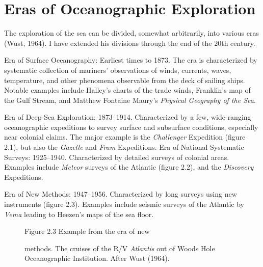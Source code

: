 \section{Eras of Oceanographic Exploration}
The exploration of the sea
can be divided, somewhat arbitrarily, into various eras (Wust,
1964). I have extended his divisions through the end of the 20th
century.
\begin{enumerate}
\vitem Era of Surface Oceanography: Earliest times to 1873. The era is
characterized by systematic collection of mariners' observations of
winds, currents, waves, temperature, and other phenomena observable
from the deck of sailing ships. Notable examples include Halley's
charts of the trade winds, Franklin's map of the Gulf
Stream, and Matthew
Fontaine Maury's \textit{Physical Geography of the Sea}.

\vitem Era of Deep-Sea Exploration: 1873--1914.  Characterized by a
few, wide-ranging oceanographic expeditions to survey surface and
subsurface conditions, especially near colonial claims. The major
example is the \textit{Challenger} Expedition (figure 2.1), but also
the \textit{Gazelle} and \textit{Fram} Expeditions.  \vitem Era of
National Systematic Surveys: 1925--1940.  Characterized by detailed
surveys of colonial areas. Examples include \textit{Meteor} surveys of
the Atlantic (figure 2.2), and the \textit{Discovery} Expeditions.

\vitem Era of New Methods: 1947--1956.  Characterized by long surveys
using new instruments (figure 2.3). Examples include seismic surveys
of the Atlantic by \textit{Vema} leading to Heezen's maps of the sea
floor.

\begin{figure}[t!]
\centering
\footnotesize
Figure 2.3 Example from the era of new \rule{0pt}{4ex}methods. The
cruises of the R/V \textit{Atlantis} out of Woods Hole Oceanographic
Institution. After Wust (1964).


\end{figure}
\end{enumerate}
